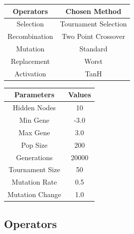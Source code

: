 \documentclass[sigconf]{acmart}
\begin{document}
\begin{center}
\begin{tabular} {|c|c|}
\hline
Operators & Chosen Method \\
\hline
Selection & Tournament Selection \\
Recombination & Two Point Crossover \\
Mutation & Standard \\
Replacement & Worst \\
Activation & TanH \\
\hline
\end{tabular}
\end{center}
\begin{center}
\begin{tabular} {|c|c|}
\hline
Parameters & Values \\
\hline
Hidden Nodes & 10 \\
Min Gene & -3.0 \\
Max Gene & 3.0 \\
Pop Size & 200 \\
Generations & 20000 \\
Tournament Size & 50 \\
Mutation Rate & 0.5 \\
Mutation Change & 1.0 \\

\hline

\end{tabular}
\end{center}

\subsection{Operators}
\end{document}
